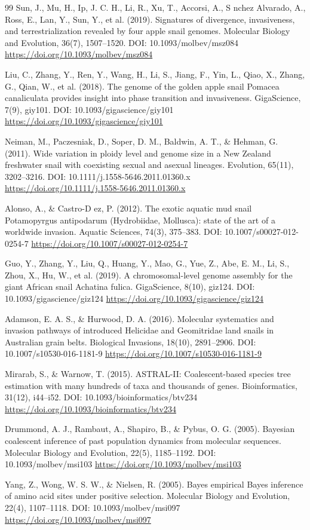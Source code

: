 \documentclass[10pt,letterpaper]{article}
\begin{document}
\begin{thebibliography}{99}
 Sun, J., Mu, H., Ip, J. C. H., Li, R., Xu, T., Accorsi, A., S nchez Alvarado, A., Ross, E., Lan, Y., Sun, Y., et al. (2019). Signatures of divergence, invasiveness, and terrestrialization revealed by four apple snail genomes. Molecular Biology and Evolution, 36(7), 1507--1520. DOI: 10.1093/molbev/msz084 \url{https://doi.org/10.1093/molbev/msz084}

 Liu, C., Zhang, Y., Ren, Y., Wang, H., Li, S., Jiang, F., Yin, L., Qiao, X., Zhang, G., Qian, W., et al. (2018). The genome of the golden apple snail Pomacea canaliculata provides insight into phase transition and invasiveness. GigaScience, 7(9), giy101. DOI: 10.1093/gigascience/giy101 \url{https://doi.org/10.1093/gigascience/giy101}

 Neiman, M., Paczesniak, D., Soper, D. M., Baldwin, A. T., \& Hehman, G. (2011). Wide variation in ploidy level and genome size in a New Zealand freshwater snail with coexisting sexual and asexual lineages. Evolution, 65(11), 3202--3216. DOI: 10.1111/j.1558-5646.2011.01360.x \url{https://doi.org/10.1111/j.1558-5646.2011.01360.x}

 Alonso, A., \& Castro-D ez, P. (2012). The exotic aquatic mud snail Potamopyrgus antipodarum (Hydrobiidae, Mollusca): state of the art of a worldwide invasion. Aquatic Sciences, 74(3), 375--383. DOI: 10.1007/s00027-012-0254-7 \url{https://doi.org/10.1007/s00027-012-0254-7}

 Guo, Y., Zhang, Y., Liu, Q., Huang, Y., Mao, G., Yue, Z., Abe, E. M., Li, S., Zhou, X., Hu, W., et al. (2019). A chromosomal-level genome assembly for the giant African snail Achatina fulica. GigaScience, 8(10), giz124. DOI: 10.1093/gigascience/giz124 \url{https://doi.org/10.1093/gigascience/giz124}

 Adamson, E. A. S., \& Hurwood, D. A. (2016). Molecular systematics and invasion pathways of introduced Helicidae and Geomitridae land snails in Australian grain belts. Biological Invasions, 18(10), 2891--2906. DOI: 10.1007/s10530-016-1181-9 \url{https://doi.org/10.1007/s10530-016-1181-9}

 Mirarab, S., \& Warnow, T. (2015). ASTRAL-II: Coalescent-based species tree estimation with many hundreds of taxa and thousands of genes. Bioinformatics, 31(12), i44--i52. DOI: 10.1093/bioinformatics/btv234 \url{https://doi.org/10.1093/bioinformatics/btv234}

 Drummond, A. J., Rambaut, A., Shapiro, B., \& Pybus, O. G. (2005). Bayesian coalescent inference of past population dynamics from molecular sequences. Molecular Biology and Evolution, 22(5), 1185--1192. DOI: 10.1093/molbev/msi103 \url{https://doi.org/10.1093/molbev/msi103}

 Yang, Z., Wong, W. S. W., \& Nielsen, R. (2005). Bayes empirical Bayes inference of amino acid sites under positive selection. Molecular Biology and Evolution, 22(4), 1107--1118. DOI: 10.1093/molbev/msi097 \url{https://doi.org/10.1093/molbev/msi097}

\end{thebibliography}
\end{document}
